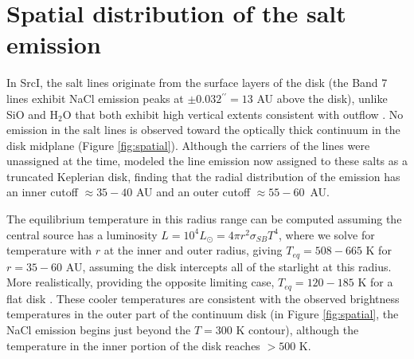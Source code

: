 \documentclass[12pt]{article}
\newcommand\arcsec{\mbox{$^{\prime\prime}$}\xspace}
\newcommand{\sourcei}{SrcI\xspace}
\newcommand{\lsun}{\ensuremath{L_{\odot}}\xspace}			%
\newcommand{\water}{H$_{2}$O\xspace}		%
\begin{document}
\section{Spatial distribution of the salt emission}
\label{sec:wherefrom}
In \sourcei, the salt lines originate from the surface layers of the disk (the Band 7
lines exhibit NaCl emission peaks at $\pm0.032\arcsec=13$ AU above the disk),
unlike SiO and \water that both exhibit high vertical extents consistent with
outflow \cite{Ginsburg2018b}.  No emission in the salt lines is observed
toward the optically thick continuum in the disk midplane (Figure
\ref{fig:spatial}).  Although the carriers of the lines were unassigned at the
time, \cite{Ginsburg2018b} modeled the line emission now assigned to these
salts as a
truncated Keplerian disk, finding that the radial distribution of the emission
has an inner cutoff $\approx35-40$ AU and an outer cutoff $\approx55-60$~AU.

The equilibrium temperature in this radius range can be computed assuming the central
source has a luminosity $L=10^4 \lsun = 4 \pi r^2 \sigma_{SB} T^4 $, where we
solve for temperature with $r$ at the inner and outer radius, giving $T_{eq} =
508-665$ K for $r=35-60$ AU, assuming the disk intercepts all of the starlight 
at this radius.  More realistically, providing the opposite limiting case,
$T_{eq}=120-185$ K for a flat disk \cite{Chiang1997a}.  These cooler temperatures
are consistent with the observed brightness temperatures in the outer
part of the continuum disk (in Figure \ref{fig:spatial}, the NaCl emission
begins just beyond the $T=300$ K contour), although the temperature in the inner
portion of the disk reaches $>500$ K.
\end{document}
